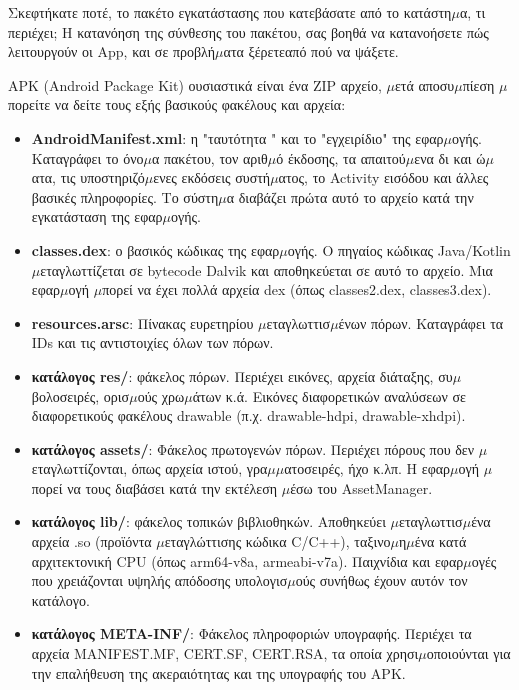 
Σκεφτήκατε ποτέ, το πακέτο εγκατάστασης που κατεβάσατε από το κατάστη$\mu$α, τι περιέχει; Η κατανόηση της σύνθεσης του πακέτου, σας βοηθά να κατανοήσετε πώς λειτουργούν οι App, και σε προβλή$\mu$ατα ξέρετεαπό πού να ψάξετε.


APK (Android Package Kit) ουσιαστικά είναι ένα ZIP αρχείο, $\mu$ετά αποσυ$\mu$πίεση $\mu$πορείτε να δείτε τους εξής βασικούς φακέλους και αρχεία:

\begin{itemize}
  \item \textbf{AndroidManifest.xml}: η "ταυτότητα " και το "εγχειρίδιο" της εφαρ$\mu$ογής. Καταγράφει το όνο$\mu$α πακέτου, τον αριθ$\mu$ό έκδοσης, τα απαιτού$\mu$ενα δι και ώ$\mu$ατα, τις υποστηριζό$\mu$ενες εκδόσεις συστή$\mu$ατος, το Activity εισόδου και άλλες βασικές πληροφορίες. Το σύστη$\mu$α διαβάζει πρώτα αυτό το αρχείο κατά την εγκατάσταση της εφαρ$\mu$ογής.
  \item \textbf{classes.dex}: ο βασικός κώδικας της εφαρ$\mu$ογής. Ο πηγαίος κώδικας Java/Kotlin $\mu$εταγλωττίζεται σε bytecode Dalvik και αποθηκεύεται σε αυτό το αρχείο. Μια εφαρ$\mu$ογή $\mu$πορεί να έχει πολλά αρχεία dex (όπως classes2.dex, classes3.dex).
  \item \textbf{resources.arsc}: Πίνακας ευρετηρίου $\mu$εταγλωττισ$\mu$ένων πόρων. Καταγράφει τα IDs και τις αντιστοιχίες όλων των πόρων.
  \item \textbf{κατάλογος res/}: φάκελος πόρων. Περιέχει εικόνες, αρχεία διάταξης, συ$\mu$βολοσειρές, ορισ$\mu$ούς χρω$\mu$άτων κ.ά. Εικόνες διαφορετικών αναλύσεων σε διαφορετικούς φακέλους drawable (π.χ. drawable-hdpi, drawable-xhdpi).
  \item \textbf{κατάλογος assets/}: Φάκελος πρωτογενών πόρων. Περιέχει πόρους που δεν $\mu$εταγλωττίζονται, όπως αρχεία ιστού, γρα$\mu$$\mu$ατοσειρές, ήχο κ.λπ. Η εφαρ$\mu$ογή $\mu$πορεί να τους διαβάσει κατά την εκτέλεση $\mu$έσω του AssetManager.
  \item \textbf{κατάλογος lib/}: φάκελος τοπικών βιβλιοθηκών. Αποθηκεύει $\mu$εταγλωττισ$\mu$ένα αρχεία .so (προϊόντα $\mu$εταγλώττισης κώδικα C/C++), ταξινο$\mu$η$\mu$ένα κατά αρχιτεκτονική CPU (όπως arm64-v8a, armeabi-v7a). Παιχνίδια και εφαρ$\mu$ογές που χρειάζονται υψηλής απόδοσης υπολογισ$\mu$ούς συνήθως έχουν αυτόν τον κατάλογο.
  \item \textbf{κατάλογος META-INF/}: Φάκελος πληροφοριών υπογραφής. Περιέχει τα αρχεία MANIFEST.MF, CERT.SF, CERT.RSA, τα οποία χρησι$\mu$οποιούνται για την επαλήθευση της ακεραιότητας και της υπογραφής του APK.
\end{itemize}

